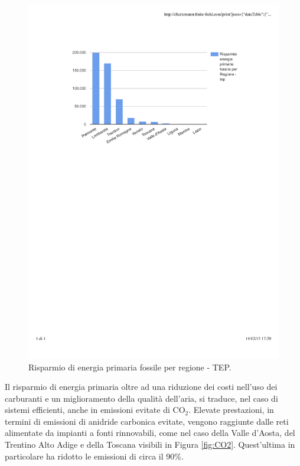 \documentclass[laurea,oneside,11pt]{USiena_tesiLM}
\begin{document}
\begin{figure}[!ht]
\centering
\includegraphics[width=\textwidth]{figure/tep} 
\caption{Risparmio di energia primaria fossile per regione - TEP.}
\label{fig:tep}
\end{figure}

Il risparmio di energia primaria oltre ad una riduzione dei costi nell'uso dei carburanti e un miglioramento della qualità dell'aria, si traduce, nel caso di sistemi efficienti, anche in emissioni evitate di CO$_2$.
Elevate prestazioni, in termini di emissioni di anidride carbonica evitate, vengono raggiunte dalle reti alimentate da impianti a fonti rinnovabili, come nel caso della Valle d'Aosta, del Trentino Alto Adige e della Toscana visibili in Figura \ref{fig:CO2}. Quest'ultima in particolare ha ridotto le emissioni di circa il 90\%.
\end{document}
